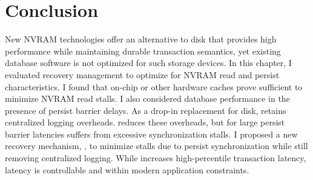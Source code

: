 \section{Conclusion}
\label{sec:OLTP_eval:Conclusion}
New NVRAM technologies offer an alternative to disk that provides high performance while maintaining durable transaction semantics, yet existing database software is not optimized for such storage devices.
In this chapter, I evaluated recovery management to optimize for NVRAM read and persist characteristics.
I found that on-chip or other hardware caches prove sufficient to minimize NVRAM read stalls.
I also considered database performance in the presence of persist barrier delays.
As a drop-in replacement for disk, \NVDisk retains centralized logging overheads.
\InPlace reduces these overheads, but for large persist barrier latencies suffers from excessive synchronization stalls.
I proposed a new recovery mechanism, \GroupCommit, to minimize stalls due to persist synchronization while still removing centralized logging.
While \GroupCommit increases high-percentile transaction latency, latency is controllable and within modern application constraints.
